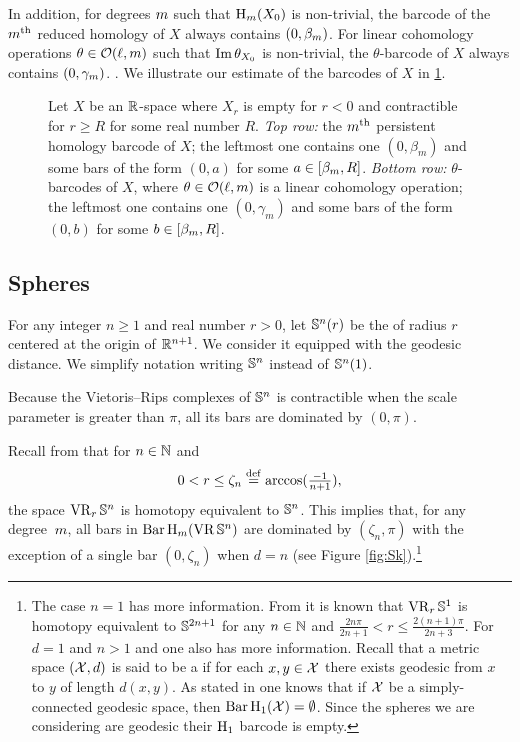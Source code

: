 In addition, for degrees $m$ such that $\mathrm{H}_m(X_0)$ is non-trivial, the barcode of the $m^{\mathrm{th}}$ reduced homology of $X$ always contains $(0,\beta_m )$.
For linear cohomology operations $\theta \in \mathcal{O}(\ell, m)$ such that $\operatorname{Im} \theta_{X_0}$ is non-trivial, the $\theta$-barcode of $X$ always contains $(0,\gamma_m)$.
.
We illustrate our estimate of the barcodes of $X$ in \cref{fig:barcodes_general}.

\begin{figure}
	\centering
	
	\caption{Let $X$ be an $\mathbb{R}$-space where $X_r$ is empty for $r<0$ and contractible for $r\geq R$ for some real number $R$. \emph{Top row:} the $m^{\mathrm{th}}$ persistent homology barcode of $X$; the leftmost one contains one $(0,\beta_m)$ and some bars of the form $(0,a)$ for some $a\in [\beta_m, R]$.
		\emph{Bottom row:} $\theta$-barcodes of $X$, where $\theta\in\mathcal{O}(\ell,m)$ is a linear cohomology operation; the leftmost one contains one $(0,\gamma_m)$ and some bars of the form $(0,b)$ for some $b\in [\beta_m, R]$.}
	\label{fig:barcodes_general}
\end{figure}

\subsection{Spheres}\label{ss:Sn}

For any integer $n \geq 1$ and real number $r > 0$, let $\mathbb{S}^n(r)$ be the  of radius $r$ centered at the origin of $\mathbb{R}^{n+1}$.
We consider it equipped with the geodesic distance.
We simplify notation writing \(\mathbb{S}^n\) instead of \(\mathbb{S}^n(1)\).

Because the Vietoris--Rips complexes of $\mathbb{S}^n$ is contractible when the scale parameter is greater than $\pi$, all its bars are dominated by $(0, \pi)$.

Recall from \cite[Thm.~7.1]{lim2020vietoris} that for $n \in \mathbb{N}$ and
\[
0 < r \leq \zeta_n \stackrel{\mathrm{def}}{=} \arccos(\tfrac{-1}{n+1}),
\]
the space $\operatorname{VR}_r\mathbb{S}^n$ is homotopy equivalent to $\mathbb{S}^n$.
This implies that, for any degree~$m$, all bars in $\operatorname{Bar}\mathrm{H}_m (\operatorname{VR}\mathbb{S}^n)$ are dominated by $(\zeta_n,\pi)$ with the exception of a single bar $(0,\zeta_n)$ when $d = n$ (see Figure \ref{fig:Sk}).\footnote{
	The case $n = 1$ has more information.
	From \cite[Thm.~7.4]{adamaszek2017vietoris} it is known that $\operatorname{VR}_r\mathbb{S}^1$ is homotopy equivalent to $\mathbb{S}^{2n+1}$ for any $n \in \mathbb{N}$ and $\frac{2n\pi}{2n+1} < r \leq \frac{2(n+1)\pi}{2n+3}$.
	For $d=1$ and $n > 1$ and one also has more information.
	Recall that a metric space $(\mathcal{X}, d)$ is said to be a  if for each $x, y \in \mathcal{X}$ there exists geodesic from $x$ to $y$ of length $d(x, y)$.
	As stated in \cite[Prop.~7.10]{virk20201} one knows that if $\mathcal{X}$ be a simply-connected geodesic space, then $\operatorname{Bar}\mathrm{H}_1(\mathcal{X}) = \emptyset$.
	Since the spheres we are considering are geodesic their $\mathrm{H}_1$ barcode is empty. }

